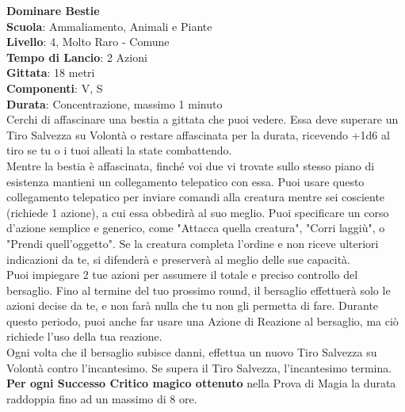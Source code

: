 \begin{multicols}{2}
\medskip\textbf{Dominare Bestie}\\
\textbf{Scuola}: Ammaliamento, Animali e Piante\\
\textbf{Livello}: 4, Molto Raro - Comune\\
\textbf{Tempo di Lancio}: 2 Azioni\\
\textbf{Gittata}: 18 metri\\
\textbf{Componenti}: V, S\\
\textbf{Durata}: Concentrazione, massimo 1 minuto\\
Cerchi di affascinare una bestia a gittata che puoi vedere. Essa deve superare un Tiro Salvezza su Volontà o restare affascinata per la durata, ricevendo +1d6 al tiro se tu o i tuoi alleati la state combattendo.\\
Mentre la bestia è affascinata, finché voi due vi trovate sullo stesso piano di esistenza mantieni un collegamento telepatico con essa. Puoi usare questo collegamento telepatico per inviare comandi alla creatura mentre sei cosciente (richiede 1 azione), a cui essa obbedirà al suo meglio. Puoi specificare un corso d'azione semplice e generico, come "Attacca quella creatura", "Corri laggiù", o "Prendi quell'oggetto". Se la creatura completa l'ordine e non riceve ulteriori indicazioni da te, si difenderà e preserverà al meglio delle sue capacità.\\
Puoi impiegare 2 tue azioni per assumere il totale e preciso controllo del bersaglio. Fino al termine del tuo prossimo round, il bersaglio effettuerà solo le azioni decise da te, e non farà nulla che tu non gli permetta di fare. Durante questo periodo, puoi anche far usare una Azione di Reazione al bersaglio, ma ciò richiede l'uso della tua reazione.\\
Ogni volta che il bersaglio subisce danni, effettua un nuovo Tiro Salvezza su Volontà contro l'incantesimo. Se supera il Tiro Salvezza, l'incantesimo termina.\\
\textbf{Per ogni Successo Critico magico ottenuto} nella Prova di Magia la durata raddoppia fino ad un massimo di 8 ore.


\end{multicols}
